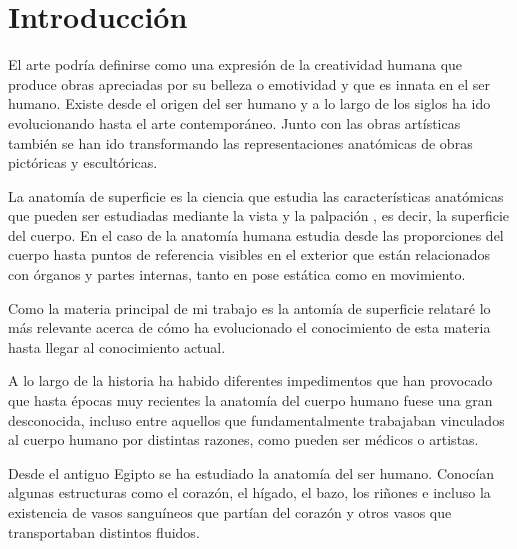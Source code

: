 \section{Introducción} %
El arte podría definirse como una expresión de la creatividad humana que produce obras apreciadas por su belleza o emotividad y que es innata en el ser humano. Existe desde el origen del ser humano y  %
a lo largo de los siglos ha ido evolucionando hasta el arte contemporáneo. Junto con las obras artísticas también se han ido transformando las representaciones anatómicas de obras pictóricas y escultóricas.

La anatomía de superficie es la ciencia que estudia las características anatómicas que pueden ser estudiadas mediante la vista y la palpación%
, es decir, la superficie del cuerpo. En el caso de la anatomía humana estudia desde las proporciones del cuerpo hasta puntos de referencia visibles en el exterior que están relacionados con órganos y partes internas, tanto en pose estática como en movimiento. %

Como la materia principal de mi trabajo es la antomía de superficie relataré lo más relevante acerca de cómo ha evolucionado el conocimiento de esta materia hasta llegar al conocimiento actual.

A lo largo de la historia ha habido diferentes impedimentos que han provocado que hasta épocas muy recientes la anatomía del cuerpo humano fuese una gran desconocida, incluso entre aquellos que fundamentalmente trabajaban vinculados al cuerpo humano por distintas razones, como pueden ser médicos o artistas.

Desde el antiguo Egipto se ha estudiado la anatomía del ser humano. Conocían algunas estructuras como el corazón, el hígado, el bazo, los riñones e incluso la existencia de vasos sanguíneos que partían del corazón y otros vasos que transportaban distintos fluidos.

